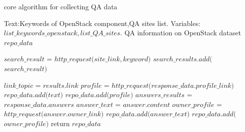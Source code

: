 \renewcommand{\algorithmicrequire}{\textbf{Input:}} 
\renewcommand{\algorithmicensure}{\textbf{Output:}}

\begin{algorithm} %
\caption{core algorithm for collecting QA data} %
\label{alg1} %
\begin{algorithmic}[1] %
\REQUIRE Text:Keywords of OpenStack component,QA sites list. Variables:$list\_keywords\_openstack,list\_QA\_sites$. %
\ENSURE QA information on OpenStack dataset $repo\_data$%

\STATE  $search\_result$ = $http\_request($$site\_link$$,$$keyword$$)$
\STATE  $search\_results.add($$search\_result$$)$
\ENDFOR

\ENDFOR

\STATE	$link\_topic$ = $results.link$
\STATE  $profile$ = $http\_request($$response\_data.profile\_link$$)$
\STATE  $repo\_data.add($$text$$)$
\STATE  $repo\_data.add($$profile$$)$
\STATE $answers\_results$ = $response\_data.answers$
\STATE  $answer\_text$ = $answer.content$
\STATE  $owner\_profile$ = $http\_request($$answer.owner\_link$$)$
\STATE  $repo\_data.add($$answer\_text$$)$
\STATE  $repo\_data.add($$owner\_profile$$)$
\ENDFOR
\ENDFOR
\STATE return $repo\_data$

\end{algorithmic} 
\end{algorithm}


